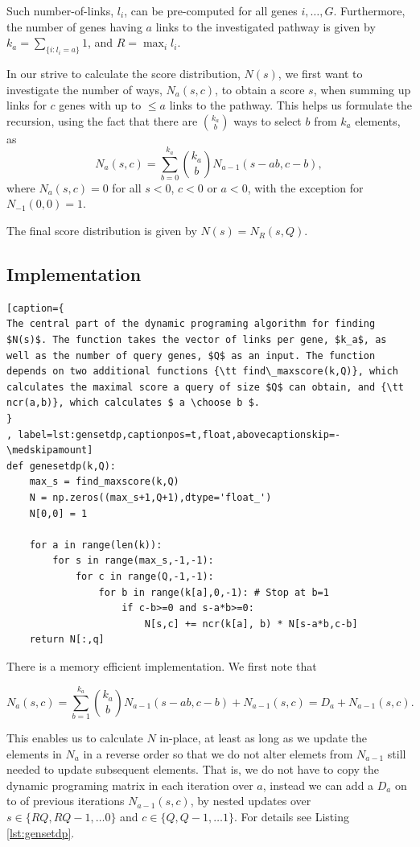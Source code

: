 \documentclass[a4paper,american]{lipics-v2016}
\begin{document}
Such number-of-links, $l_i$, can be pre-computed for all genes $i, \ldots, G$.
Furthermore, the number of genes having $a$ links to the investigated pathway is given by $k_a=\sum_{\{i:l_i=a\}}1$, and $R=\max_{i}{l_i}$.

In our strive to calculate the score distribution, $N(s)$, we first want to investigate the number of ways, $N_a(s,c)$, to obtain a score $s$, when summing up links for $c$ genes with up to $\le a$ links to the pathway. This helps us formulate the recursion, using the fact that there are $k_a \choose b$ ways to select $b$ from $k_a$ elements, as
\begin{equation}
N_a(s,c)=\sum_{b=0}^{k_a}{k_a \choose b} N_{a-1}(s-ab,c-b),
\end{equation}
where $N_a(s,c)=0$ for all $s<0$, $c<0$ or $a<0$, with the exception for $N_{-1}(0,0)=1$.

The final score distribution is given by $N(s)=N_R(s,Q)$.

\subsection*{Implementation}

\begin{lstlisting}[caption={
The central part of the dynamic programing algorithm for finding $N(s)$. The function takes the vector of links per gene, $k_a$, as well as the number of query genes, $Q$ as an input. The function depends on two additional functions {\tt find\_maxscore(k,Q)}, which calculates the maximal score a query of size $Q$ can obtain, and {\tt ncr(a,b)}, which calculates $ a \choose b $.
}
, label=lst:gensetdp,captionpos=t,float,abovecaptionskip=-\medskipamount]
def genesetdp(k,Q):
    max_s = find_maxscore(k,Q)
    N = np.zeros((max_s+1,Q+1),dtype='float_')
    N[0,0] = 1

    for a in range(len(k)):
        for s in range(max_s,-1,-1):
            for c in range(Q,-1,-1):
                for b in range(k[a],0,-1): # Stop at b=1
                    if c-b>=0 and s-a*b>=0:
                        N[s,c] += ncr(k[a], b) * N[s-a*b,c-b]
    return N[:,q]
\end{lstlisting}
There is a memory efficient implementation. We first note that

\[
N_a(s,c)=\sum_{b=1}^{k_a}{k_a \choose b} N_{a-1}(s-ab,c-b) + N_{a-1}(s,c)=D_a+N_{a-1}(s,c).
\]


This enables us to calculate $N$ in-place, at least as long as we update the elements in $N_a$ in a reverse order so that we do not alter elemets from $N_{a-1}$ still needed to update subsequent elements. That is, we do not have to copy the dynamic programing matrix in each iteration over $a$, instead we can add a $D_a$ on to of previous iterations $N_{a-1}(s,c)$, by nested updates over $s \in \{ RQ, RQ-1, \ldots 0 \}$ and $c \in \{ Q, Q-1, \ldots 1 \}$. For details see Listing \ref{lst:gensetdp}.
\end{document}
